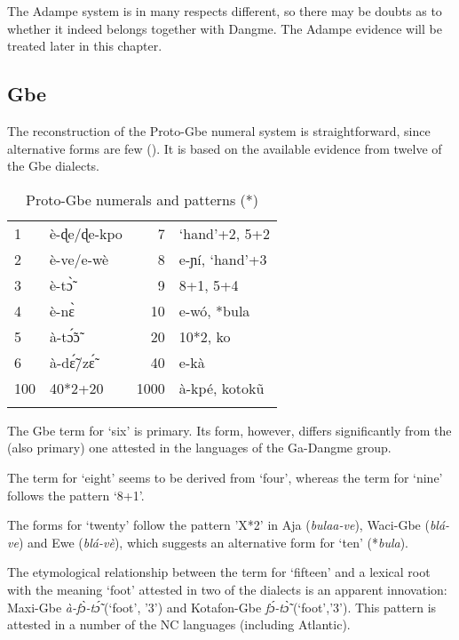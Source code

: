 The Adampe system is in many respects different, so there may be doubts as to whether it indeed belongs together with Dangme. The Adampe evidence will be treated later in this chapter.


\subsection{Gbe}%
The reconstruction of the Proto-Gbe numeral system is straightforward, since alternative forms are few (). It is based on the available evidence from twelve of the Gbe dialects.

\begin{table}
\caption{\label{tab:3:66}Proto-Gbe numerals and patterns (*)}


\begin{tabularx}{.8\textwidth}{lXrl}
\lsptoprule

1 & è-ɖe/ɖe-kpo & 7 & ‘hand’+2, 5+2\\
2 & è-ve/e-wè & 8 & e-ɲí, ‘hand’+3\\
3 & è-t{\`{\~ɔ}} & 9 & 8+1, 5+4 \\
4 & è-n{\`{ɛ}} & 10 & e-wó, *bula\\
5 & à-t{\'{\~ɔ}}{\~{ɔ}} & 20 & 10*2, ko\\
6 & à-d{\'{\~ɛ}}/z{\'{\~ɛ}} & 40 & e-kà\\
100 & 40*2+20 & 1000 & à-kpé, kotok{\~{u}}\\
\lspbottomrule
\end{tabularx}
\end{table}

The Gbe term for ‘six’ is primary. Its form, however, differs significantly from the (also primary) one attested in the languages of the Ga-Dangme group.

The term for ‘eight’ seems to be derived from ‘four’, whereas the term for ‘nine’ follows the pattern ‘8+1’.

The forms for ‘twenty’ follow the pattern ’X*2’ in Aja (\textit{bulaa-ve}), Waci-Gbe (\textit{blá-ve}) and Ewe (\textit{blá-vè}), which suggests an alternative form for ‘ten’ (*\textit{bula}).

The etymological relationship between the term for ‘fifteen’ and a lexical root with the meaning ‘foot’ attested in two of the dialects is an apparent innovation: Maxi-Gbe \textit{à-f{\`{ɔ}}-t{\'{\~ɔ}}} (‘foot’, ’3’) and Kotafon-Gbe \textit{f{\'{ɔ}}-t{\`{\~ɔ}}} (‘foot’,’3’). This pattern is attested in a number of the NC languages (including Atlantic). 

